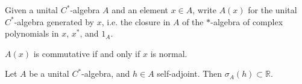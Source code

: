 \documentclass[12pt]{article}
\begin{document}
\begin{definition}
	Given a unital $C^\ast$-algebra $A$ and an element $x\in A$, write $A(x)$ for the unital $C^\ast$-algebra generated by $x$, i.e. the closure in $A$ of the $\ast$-algebra of complex polynomials in $x$, $x^\ast$, and $1_A$.
\end{definition}

\begin{corollary}
\label{cor_ax_comm_if_x_normal}
	$A(x)$ is commutative if and only if $x$ is normal.
\end{corollary}



\begin{proposition}
\label{prop_spectrum_selfadjoint_is_real}
	Let $A$ be a unital $C^\ast$-algebra, and $h\in A$ self-adjoint. Then $\sigma_A(h)\subset\mathbb{R}$.
\end{proposition}
\end{document}
